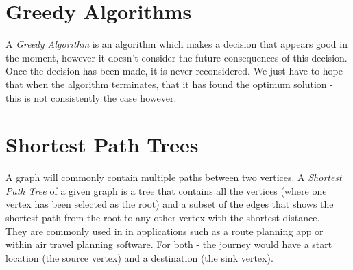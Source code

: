 
\section{Greedy Algorithms}
A \textit{Greedy Algorithm} is an algorithm which makes a decision that appears good in the moment, however it doesn't consider the future consequences of this decision. Once the decision has been made, it is never reconsidered. We just have to hope that when the algorithm terminates, that it has found the optimum solution - this is not consistently the case however. 

\section{Shortest Path Trees}
A graph will commonly contain multiple paths between two vertices. A \textit{Shortest Path Tree} of a given graph is a tree that contains all the vertices (where one vertex has been selected as the root) and a subset of the edges that shows the shortest path from the root to any other vertex with the shortest distance.\\

They are commonly used in in applications such as a route planning app or within air travel planning software. For both - the journey would have a start location (the source vertex) and a destination (the sink vertex). 

